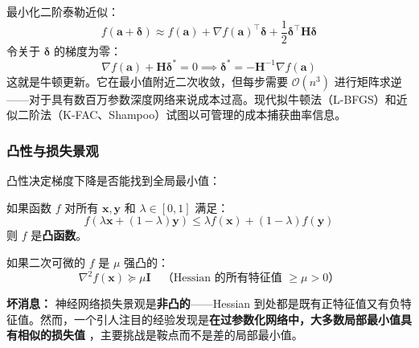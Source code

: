\begin{示例}[牛顿法作为二阶近似]
最小化二阶泰勒近似：
\begin{equation}
f(\mathbf{a} + \boldsymbol{\delta}) \approx f(\mathbf{a}) + \nabla f(\mathbf{a})^\top \boldsymbol{\delta} + \frac{1}{2}\boldsymbol{\delta}^\top \mathbf{H}\boldsymbol{\delta}
\end{equation}
令关于 $\boldsymbol{\delta}$ 的梯度为零：
\begin{equation}
\nabla f(\mathbf{a}) + \mathbf{H}\boldsymbol{\delta}^* = 0 \implies \boldsymbol{\delta}^* = -\mathbf{H}^{-1}\nabla f(\mathbf{a})
\end{equation}
这就是牛顿更新。它在最小值附近二次收敛，但每步需要 $\mathcal{O}(n^3)$ 进行矩阵求逆——对于具有数百万参数深度网络来说成本过高。现代拟牛顿法（L-BFGS）和近似二阶法（K-FAC、Shampoo）试图以可管理的成本捕获曲率信息。
\end{示例}

\subsubsection{凸性与损失景观}

凸性决定梯度下降是否能找到全局最小值：

\begin{定义}[凸函数]
如果函数 $f$ 对所有 $\mathbf{x}, \mathbf{y}$ 和 $\lambda \in [0,1]$ 满足：
\begin{equation}
f(\lambda \mathbf{x} + (1-\lambda)\mathbf{y}) \leq \lambda f(\mathbf{x}) + (1-\lambda)f(\mathbf{y})
\end{equation}
则 $f$ 是\textbf{凸函数}。
\end{定义}

\begin{定义}[强凸函数]
如果二次可微的 $f$ 是 $\mu$ 强凸的：
\begin{equation}
\nabla^2 f(\mathbf{x}) \succeq \mu \mathbf{I} \quad \text{（Hessian 的所有特征值 $\geq \mu > 0$）}
\end{equation}
\end{定义}

\textbf{坏消息：} 神经网络损失景观是\textbf{非凸的}——Hessian 到处都是既有正特征值又有负特征值。然而，一个引人注目的经验发现是\textbf{在过参数化网络中，大多数局部最小值具有相似的损失值} \cite{choriomanska2015loss}，主要挑战是鞍点而不是差的局部最小值。

